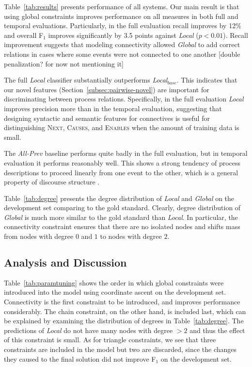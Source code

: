 Table~\ref{tab:results} presents performance of all systems. Our main result is that using global constraints improves performance on all measures in both full and temporal evaluations. Particularly, in the full evaluation recall improves by 12\% and overall F$_1$ improves significantly by 3.5 points against \emph{Local} ($p<0.01$). Recall improvement suggests that modeling connectivity allowed \emph{Global} to add correct relations in cases where some events were not connected to one another [double penalization? for now not mentioning it]

The full \emph{Local} classifier substantially outperforms \emph{Local$_{base}$}. This indicates that our novel features (Section~\ref{subsec:pairwise-novel}) are important for discriminating between process relations. Specifically, in the full evaluation \emph{Local} improves precision more than in the temporal evaluation, suggesting that designing syntactic and semantic features for connectives is useful for distinguishing \textsc{Next}, \textsc{Causes}, and \textsc{Enables} when the amount of training data is small.

The \emph{All-Prev} baseline performs quite badly in the full evaluation, but in temporal evaluation it performs reasonably well. This shows a strong tendency of process descriptions to proceed linearly from one event to the other, which is a general property of discourse structure \cite{schegloff73}.

Table~\ref{tab:degree} presents the degree distribution of \emph{Local} and \emph{Global} on the development set comparing to the gold standard. Clearly, degree distribution of \emph{Global} is much more similar to the gold standard than \emph{Local}. In particular, the connectivity constraint ensures that there are no isolated nodes and shifts mass from nodes with degree $0$ and $1$ to nodes with degree $2$.


\subsection{Analysis and Discussion}

Table~\ref{tab:paramtuning} shows the order in which global constraints were introduced into the model using coordinate ascent on the development set. Connectivity is the first constraint to be introduced, and improves performance considerably. The chain constraint, on the other hand, is included last, which can be explained by examining the distribution of degrees in Table~\ref{tab:degree}. The predictions of \emph{Local} do not have many nodes with degree $>2$ and thus the effect of this constraint is small. As for triangle constraints, we see that three constraints are included in the model but two are discarded, since the changes they caused to the final solution did not improve F$_1$ on the development set.


